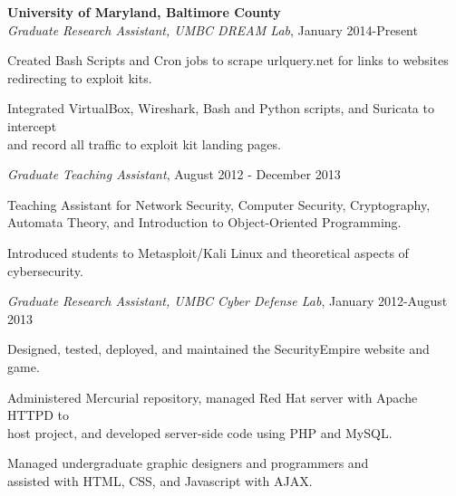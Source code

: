 \medskip
\atab \textbf{University of Maryland, Baltimore County}\\
\btab \textit{Graduate Research Assistant, UMBC DREAM Lab}, January 2014-Present\\
\begin{my_list}
\item Created Bash Scripts and Cron jobs to scrape urlquery.net for links to websites\\ \tab \tab redirecting to exploit kits.
\item Integrated VirtualBox, Wireshark, Bash and Python scripts, and Suricata to intercept\\ \tab \tab and record all traffic to exploit kit landing pages.
\end{my_list}

\btab \textit{Graduate Teaching Assistant}, August 2012 - December 2013\\
\begin{my_list}
\item Teaching Assistant for Network Security, Computer Security, Cryptography,\\ \tab \tab Automata Theory, and Introduction to Object-Oriented Programming.
\item Introduced students to Metasploit/Kali Linux and theoretical aspects of cybersecurity.
\end{my_list}

\btab \textit{Graduate Research Assistant, UMBC Cyber Defense Lab}, January 2012-August 2013\\
\begin{my_list}
\item Designed, tested, deployed, and maintained the SecurityEmpire website and game.
\item Administered Mercurial repository, managed Red Hat server with Apache HTTPD to\\ \tab \tab host project, and developed server-side code using PHP and MySQL.
\item Managed undergraduate graphic designers and programmers and\\ \tab \tab assisted with HTML, CSS, and Javascript with AJAX.
\end{my_list}


